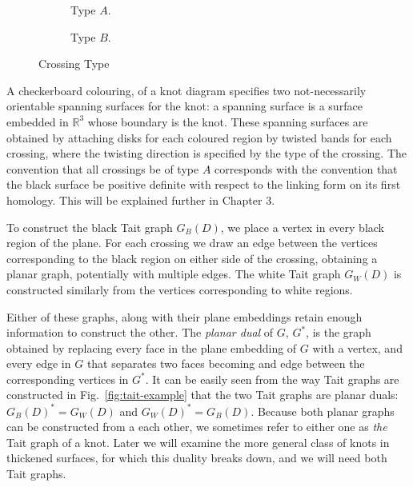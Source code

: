 \documentclass[12pt]{report}
\newcommand{\R}{\mathbb{R}}
\theoremstyle{upright}
\begin{document}
\begin{figure}[hbt]
	\centering
	\hspace*{\fill}
	\begin{subfigure}[b]{0.4 \textwidth}
		\centering
		\def\svgscale{0.28}
		
		\caption{Type $A$.}
		\label{fig:type-a}
	\end{subfigure}
	\hspace*{\fill} \hspace*{\fill}	\hspace*{\fill}
	\begin{subfigure}[b]{0.4 \textwidth}
		\centering
		\def\svgscale{0.28}
		
		\caption{Type $B$.}
		\label{fig:type-b}
	\end{subfigure}
	\hspace*{\fill} 
	\caption{Crossing Type}
	\label{fig:crossing-type}
\end{figure}


A checkerboard colouring, of a knot diagram specifies two not-necessarily orientable spanning surfaces for the knot: a spanning surface is a surface embedded in $\R^{3}$ whose boundary is the knot. These spanning surfaces are obtained by attaching disks for each coloured region by twisted bands for each crossing, where the twisting direction is specified by the type of the crossing. The convention that all crossings be of type $A$ corresponds with the convention that the black surface be positive definite with respect to the linking form on its first homology. This will be explained further in Chapter 3.

To construct the black Tait graph $G_{B}(D)$, we place a vertex in every black region of the plane. For each crossing we draw an edge between the vertices corresponding to the black region on either side of the crossing, obtaining a planar graph, potentially with multiple edges. The white Tait graph $G_{W}(D)$ is constructed similarly from the vertices corresponding to white regions.

Either of these graphs, along with their plane embeddings retain enough information to construct the other. The \textit{planar dual} of $G$, $G^{*}$, is the graph obtained by replacing every face in the plane embedding of $G$ with a vertex, and every edge in $G$ that separates two faces becoming and edge between the corresponding vertices in $G^{*}$. It can be easily seen from the way Tait graphs are constructed in Fig.~\ref{fig:tait-example} that the two Tait graphs are planar duals: $G_{B}(D)^{*} = G_{W}(D)$ and $G_{W}(D)^{*} = G_{B}(D)$. Because both planar graphs can be constructed from a each other, we sometimes refer to either one as \textit{the} Tait graph of a knot. Later we will examine the more general class of knots in thickened surfaces, for which this duality breaks down, and we will need both Tait graphs.
\end{document}
